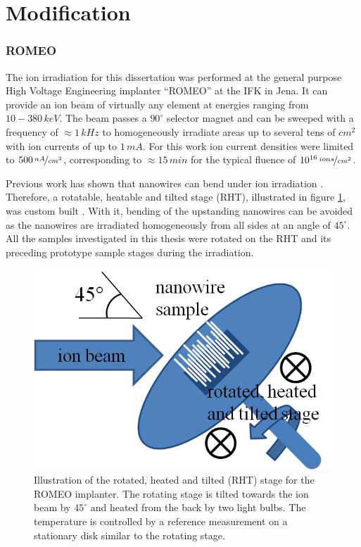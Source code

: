 
\section{Modification}


\subsubsection{ROMEO}


The ion irradiation for this dissertation was performed at the general purpose High Voltage Engineering implanter ``ROMEO'' at the IFK in Jena. It can provide an ion beam of virtually any element at energies ranging from $10-380\,keV$. The beam passes a $90^\circ$ selector magnet and can be sweeped with a frequency of $\approx 1\,kHz$ to homogeneously irradiate areas up to several tens of $cm^2$ with ion currents of up to $1\,mA$. For this work ion current densities were limited to $500\,\nicefrac{nA}{cm^2}$, corresponding to $\approx 15\,min$ for the typical fluence of $10^{16}\,\nicefrac{ions}{cm^2}$.

Previous work has shown that nanowires can bend under ion irradiation \cite{borschel_permanent_2011, borschel_ion-solid_2012}. Therefore, a rotatable, heatable and tilted stage (RHT), illustrated in figure \ref{RHT}, was custom built \cite{noack_sputter_2014}. With it, bending of the upstanding nanowires can be avoided as the nanowires are irradiated homogeneously from all sides at an angle of $45^\circ$. All the samples investigated in this thesis were rotated on the RHT and its preceding prototype sample stages during the irradiation. 

\begin{figure}
	\centering
		\includegraphics[width=.5\textwidth]{images/RHT.png}
	\caption{Illustration of the rotated, heated and tilted (RHT) stage for the ROMEO implanter. The rotating stage is tilted towards the ion beam by $45^\circ$ and heated from the back by two light bulbs. The temperature is controlled by a reference measurement on a stationary disk similar to the rotating stage.}
	\label{RHT}
\end{figure} 

